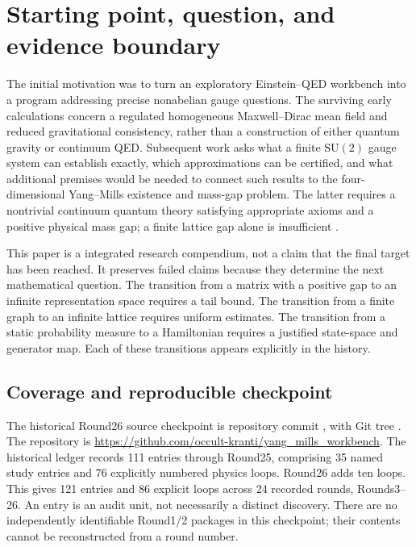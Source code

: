 \section{Starting point, question, and evidence boundary}
\label{sec:introduction}

The initial motivation was to turn an exploratory Einstein--QED workbench into a program addressing precise nonabelian gauge questions. The surviving early calculations concern a regulated homogeneous Maxwell--Dirac mean field and reduced gravitational consistency, rather than a construction of either quantum gravity or continuum QED. Subsequent work asks what a finite $\mathrm{SU}(2)$ gauge system can establish exactly, which approximations can be certified, and what additional premises would be needed to connect such results to the four-dimensional Yang--Mills existence and mass-gap problem. The latter requires a nontrivial continuum quantum theory satisfying appropriate axioms and a positive physical mass gap; a finite lattice gap alone is insufficient \cite{jaffe_witten}.

This paper is a integrated research compendium, not a claim that the final target has been reached. It preserves failed claims because they determine the next mathematical question. The transition from a matrix with a positive gap to an infinite representation space requires a tail bound. The transition from a finite graph to an infinite lattice requires uniform estimates. The transition from a static probability measure to a Hamiltonian requires a justified state-space and generator map. Each of these transitions appears explicitly in the history.

\subsection{Coverage and reproducible checkpoint}
The historical Round26 source checkpoint is repository commit
,
with Git tree .
The repository is
\url{https://github.com/occult-kranti/yang_mills_workbench}.
The historical ledger records 111 entries through Round25, comprising 35 named study entries and 76 explicitly numbered physics loops. Round26 adds ten loops. This gives 121 entries and 86 explicit loops across 24 recorded rounds, Rounds3--26. An entry is an audit unit, not necessarily a distinct discovery. There are no independently identifiable Round1/2 packages in this checkpoint; their contents cannot be reconstructed from a round number.

